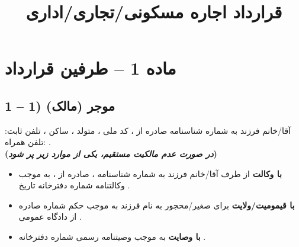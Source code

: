 \documentclass[14pt]{article}
\title{\titlefont قرارداد اجاره مسکونی/تجاری/اداری}
\author{}
\date{}
\begin{document}
	
	\maketitle
	
	\section*{ماده 1 – طرفین قرارداد}
	\subsection*{1 – 1) موجر (مالک)}
	آقا/خانم
	\underline{\hspace{3cm}}
	فرزند
	\underline{\hspace{2cm}}
	به شماره شناسنامه
	\underline{\hspace{2cm}}
	صادره از
	\underline{\hspace{1cm}}
	، کد ملی
	\underline{\hspace{2cm}}
	، متولد
	\underline{\hspace{1cm}}
	، ساکن
	\underline{\hspace{4cm}}
	، تلفن ثابت:
	\underline{\hspace{2cm}}
	تلفن همراه:
	\underline{\hspace{2cm}}
	.
	\\
	\textbf{(\textit{در صورت عدم مالکیت مستقیم، یکی از موارد زیر پر شود})}
	
	\begin{itemize}
		\item 
		\textbf{با وکالت}
		از طرف آقا/خانم 
		\underline{\hspace{4cm}}
		فرزند 
		\underline{\hspace{1.5cm}}
		به شماره شناسنامه 
		\underline{\hspace{2cm}}
		، صادره از 
		\underline{\hspace{2cm}}
		، به موجب وکالتنامه شماره 
		\underline{\hspace{2cm}}
		دفترخانه 
		\underline{\hspace{2cm}}
		تاریخ 
		\underline{\hspace{2cm}}
		.
		\item 
		\textbf{با قیمومیت/ولایت}
		برای صغیر/محجور به نام 
		\underline{\hspace{2.5cm}}
		فرزند 
		\underline{\hspace{2cm}}
		به موجب حکم شماره 
		\underline{\hspace{2cm}}
		صادره از دادگاه عمومی 
		\underline{\hspace{2cm}}
		.
		\item 
		\textbf{با وصایت}
		به موجب وصیتنامه رسمی شماره 
		\underline{\hspace{3cm}}
		دفترخانه 
		\underline{\hspace{2cm}}
		.
	\end{itemize}
	
\end{document}
